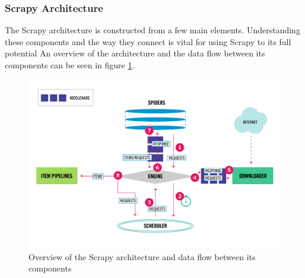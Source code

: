 \documentclass[12pt,a4paper,twoside]{report}
\begin{document}
\subsubsection{Scrapy Architecture} \label{scrapy_arch}

The Scrapy architecture is constructed from a few main elements. Understanding these components and the way they connect is vital for using Scrapy to its full potential An overview of the architecture and the data flow between its components can be seen in figure \ref{fig:scrapy_architecture}.

\begin{figure}[ht]
  \centering
  \includegraphics[width=\linewidth]{img/scrapy_architecture_02.png}
  \caption[]{Overview of the Scrapy architecture and data flow between its components \footnotemark[4]}
  \label{fig:scrapy_architecture}
\end{figure}

\end{document}
